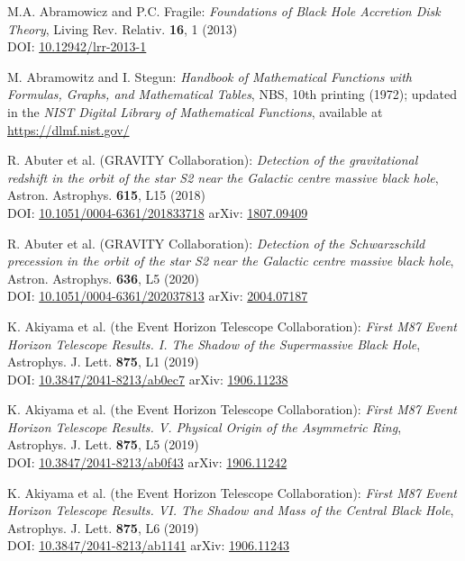 \begin{thebibliography}{123}

M.A. Abramowicz and P.C. Fragile:
{\em Foundations of Black Hole Accretion Disk Theory},
Living Rev. Relativ. {\bf 16}, 1 (2013)\\
DOI: \href{https://doi.org/10.12942/lrr-2013-1}{10.12942/lrr-2013-1}

M. Abramowitz and I. Stegun:
{\em Handbook of Mathematical Functions with Formulas, Graphs, and Mathematical Tables},
NBS, 10th printing (1972); updated in the
{\em NIST Digital Library of Mathematical Functions}, available at\\
\url{https://dlmf.nist.gov/}

R. Abuter et al. (GRAVITY Collaboration):
{\em Detection of the gravitational redshift in the orbit of the star S2 near the Galactic centre massive black hole},
Astron. Astrophys. {\bf 615}, L15 (2018)\\
DOI: \href{https://doi.org/10.1051/0004-6361/201833718}{10.1051/0004-6361/201833718}\hfill
arXiv: \href{https://arxiv.org/abs/1807.09409}{1807.09409}

R. Abuter et al. (GRAVITY Collaboration):
{\em Detection of the Schwarzschild precession in the orbit of the star
S2 near the Galactic centre massive black hole},
Astron. Astrophys. {\bf 636}, L5 (2020)\\
DOI: \href{https://doi.org/10.1051/0004-6361/202037813}{10.1051/0004-6361/202037813}\hfill
arXiv: \href{https://arxiv.org/abs/2004.07187}{2004.07187}

K. Akiyama et al. (the Event Horizon Telescope Collaboration):
{\em First M87 Event Horizon Telescope Results. I. The Shadow of the Supermassive Black Hole},
Astrophys. J. Lett. {\bf 875}, L1 (2019)\\
DOI: \href{https://doi.org/10.3847/2041-8213/ab0ec7}{10.3847/2041-8213/ab0ec7}\hfill
arXiv: \href{https://arxiv.org/abs/1906.11238}{1906.11238}

K. Akiyama et al. (the Event Horizon Telescope Collaboration):
{\em First M87 Event Horizon Telescope Results. V. Physical Origin of the Asymmetric Ring},
Astrophys. J. Lett. {\bf 875}, L5 (2019)\\
DOI: \href{https://doi.org/10.3847/2041-8213/ab0f43}{10.3847/2041-8213/ab0f43}\hfill
arXiv: \href{https://arxiv.org/abs/1906.11242}{1906.11242}

K. Akiyama et al. (the Event Horizon Telescope Collaboration):
{\em First M87 Event Horizon Telescope Results. VI. The Shadow and Mass of the Central Black Hole},
Astrophys. J. Lett. {\bf 875}, L6 (2019)\\
DOI: \href{https://doi.org/10.3847/2041-8213/ab1141}{10.3847/2041-8213/ab1141}\hfill
arXiv: \href{https://arxiv.org/abs/1906.11243}{1906.11243}


\end{thebibliography}

